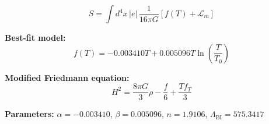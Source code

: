 
\begin{equation}
  S = \int d^4x \, |e| \, \frac{1}{16\pi G} \left[ f(T) + \mathcal{L}_m \right]
\end{equation}

\textbf{Best-fit model:}
\begin{equation}
  f(T) = -0.003410 T + 0.005096 T \ln\!\left(\frac{T}{T_0}\right)
\end{equation}

\textbf{Modified Friedmann equation:}
\begin{equation}
  H^2 = \frac{8\pi G}{3} \rho - \frac{f}{6} + \frac{T f_T}{3}
\end{equation}

\textbf{Parameters:}
$\alpha = -0.003410$, \quad
$\beta = 0.005096$, \quad
$n = 1.9106$, \quad
$\Lambda_{\text{BI}} = 575.3417$